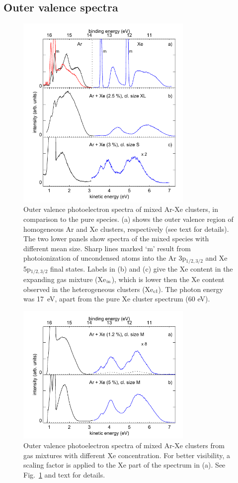 \subsection{Outer valence spectra}
%
\begin{figure}[ht]
 \centering
 \includegraphics[width=8.5cm]{pics/figure_oval_1.pdf}
 \caption{
Outer valence photoelectron spectra of mixed Ar-Xe clusters, in comparison to the pure species. 
(a) shows the outer valence region of homogeneous Ar and Xe clusters, respectively (see text for details). 
The two lower panels show spectra of the mixed species with different mean size. 
Sharp lines marked `m' result from photoionization of uncondensed atoms into the Ar 3p$_{1/2,3/2}$ and Xe 5p$_{1/2,3/2}$ final states. 
Labels in (b) and (c) give the Xe content in the expanding gas mixture (Xe$_{\rm in}$), which is lower then the Xe content observed in the heterogeneous clusters (Xe$_{\rm cl}$). 
The photon energy was 17~eV, apart from the pure Xe cluster spectrum (60 eV).
{\color{red}{Die Stabilisierung der Xe-bulk Atome ist in den gemischten Cluster
 höher als in den gemischten Clustern. Das ist ungewöhnlich. Habt ihr hier
 verschiedene CLustergrößen?}}
}
 \label{figure:oval1}
\end{figure}


\begin{figure}[ht]
 \centering
 \includegraphics[width=8.5cm]{pics/figure_oval_2.pdf}
 \caption{
Outer valence photoelectron spectra of mixed Ar-Xe clusters from gas mixtures with different Xe concentration. 
For better visibility, a scaling factor is applied to the Xe part of the spectrum in (a).
See Fig.\ \ref{figure:oval1} and text for details.
}
 \label{figure:oval2}
\end{figure}

